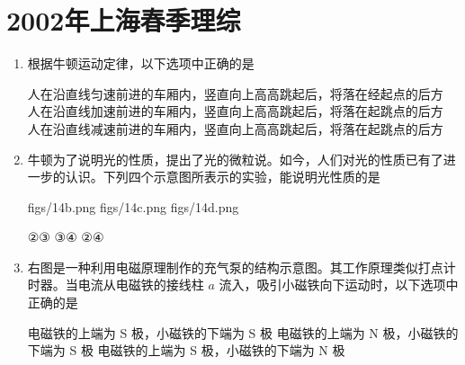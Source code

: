 \documentclass[\gkver]{gaokaozhenti}
\begin{document}
\chapter{2002年上海春季理综}

\begin{enumerate}
\item
根据牛顿运动定律，以下选项中正确的是

{人在沿直线匀速前进的车厢内，竖直向上高高跳起后，将落在经起点的后方}
{人在沿直线加速前进的车厢内，竖直向上高高跳起后，将落在起跳点的后方}
{人在沿直线减速前进的车厢内，竖直向上高高跳起后，将落在起跳点的后方}


\item
牛顿为了说明光的性质，提出了光的微粒说。如今，人们对光的性质已有了进一步的认识。下列四个示意图所表示的实验，能说明光性质的是

{figs/14b.png}
{figs/14c.png}
{figs/14d.png}

{②③}
{③④}
{②④}


\item
右图是一种利用电磁原理制作的充气泵的结构示意图。其工作原理类似打点计时器。当电流从电磁铁的接线柱 $a$ 流入，吸引小磁铁向下运动时，以下选项中正确的是


{电磁铁的上端为 S 极，小磁铁的下端为 S 极}
{电磁铁的上端为 N 极，小磁铁的下端为 S 极}
{电磁铁的上端为 S 极，小磁铁的下端为 N 极}


\end{enumerate}
\end{document}

